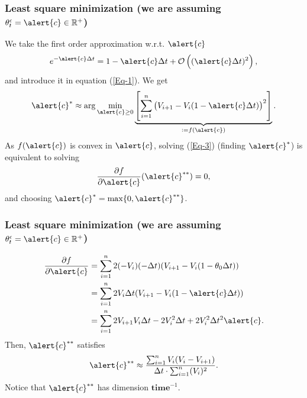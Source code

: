 \documentclass[aspectratio=169]{beamer}\usepackage[utf8]{inputenc}
\newcommand{\R}{\mathbb{R}}
\begin{document}
\begin{frame}\frametitle{Least square minimization (we are assuming $\theta_t^\epsilon=\alert{c}\in\R^+$)}

We take the first order approximation w.r.t. $\alert{c}$
\begin{equation*}
e^{-\alert{c}\Delta t}=1-\alert{c}\Delta t+\mathcal{O}\left((\alert{c}\Delta t)^2\right),
\end{equation*}
and introduce it in equation ({\color{blue}\ref{Eq-1}}). We get
\begin{equation}
\alert{c}^*\approx\arg\min_{\alert{c}\geq0}\underbrace{\left[\sum_{i=1}^n\left(V_{i+1}-V_i(1-\alert{c}\Delta t)\right)^2\right]}_{:=f(\alert{c})}.
\label{Eq-3}
\end{equation}
As $f(\alert{c})$ is convex in $\alert{c}$, solving ({\color{blue}\ref{Eq-3}}) (finding $\alert{c}^*$) is equivalent to solving
\begin{equation}
\frac{\partial f}{\partial\alert{c}}(\alert{c}^{**})=0,
\label{Eq-9}
\end{equation}
and choosing $\alert{c}^*=\max\{0,\alert{c}^{**}\}$.

\end{frame}


\begin{frame}\frametitle{Least square minimization (we are assuming $\theta_t^\epsilon=\alert{c}\in\R^+$)}\label{QMM}

\begin{equation*}
\begin{split}
\frac{\partial f}{\partial\alert{c}}&=\sum_{i=1}^n2(-V_i)(-\Delta t)(V_{i+1}-V_i(1-\theta_0\Delta t))\\
&=\sum_{i=1}^n2V_i\Delta t(V_{i+1}-V_i(1-\alert{c}\Delta t))\\
&=\sum_{i=1}^n2V_{i+1}V_i\Delta t-2V_i^2\Delta t+2V_i^2\Delta t^2\alert{c}.
\end{split}
\end{equation*}
Then, $\alert{c}^{**}$ satisfies
\begin{equation}
\alert{c}^{**}\approx\frac{\sum_{i=1}^nV_i(V_i-V_{i+1})}{\Delta t\cdot\sum_{i=1}^n(V_i)^2}.
\label{Eq-4}
\end{equation}
Notice that $\alert{c}^{**}$ has dimension $\mathbf{time}^{-1}$.

\end{frame}
\end{document}
